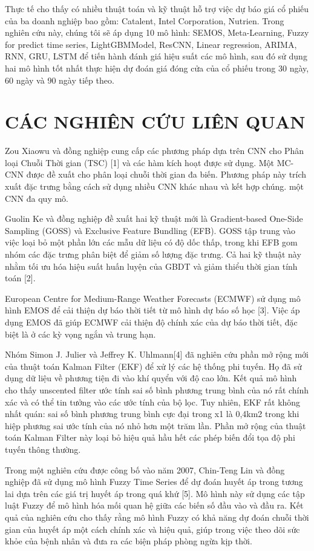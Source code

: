 \documentclass[conference]{IEEEtran}
\begin{document}
Thực tế cho thấy có nhiều thuật toán và kỹ thuật hỗ trợ việc dự báo giá cổ phiếu của ba doanh nghiệp bao gồm: Catalent, Intel Corporation, Nutrien. Trong nghiên cứu này, chúng tôi sẽ áp dụng 10 mô hình: SEMOS, Meta-Learning, Fuzzy for predict time series, LightGBMModel, ResCNN, Linear regression, ARIMA, RNN, GRU, LSTM để tiến hành đánh giá hiệu suất các mô hình, sau đó sử dụng hai mô hình tốt nhất thực hiện dự đoán giá đóng cửa của cổ phiếu trong 30 ngày, 60 ngày và 90 ngày tiếp theo. 

\section{CÁC NGHIÊN CỨU LIÊN QUAN}
Zou Xiaowu và đồng nghiệp cung cấp các phương pháp dựa trên CNN cho Phân loại Chuỗi Thời gian (TSC) [1] và các hàm kích hoạt được sử dụng. Một MC-CNN được đề xuất cho phân loại chuỗi thời gian đa biến. Phương pháp này trích xuất đặc trưng bằng cách sử dụng nhiều CNN khác nhau và kết hợp chúng. một CNN đa quy mô.

Guolin Ke và đồng nghiệp đề xuất hai kỹ thuật mới là Gradient-based One-Side Sampling (GOSS) và Exclusive Feature Bundling (EFB). GOSS tập trung vào việc loại bỏ một phần lớn các mẫu dữ liệu có độ dốc thấp, trong khi EFB gom nhóm các đặc trưng phân biệt để giảm số lượng đặc trưng. Cả hai kỹ thuật này nhằm tối ưu hóa hiệu suất huấn luyện của GBDT và giảm thiểu thời gian tính toán [2].

European Centre for Medium-Range Weather Forecasts (ECMWF) sử dụng mô hình EMOS để cải thiện dự báo thời tiết từ mô hình dự báo số học [3]. Việc áp dụng EMOS đã giúp ECMWF cải thiện độ chính xác của dự báo thời tiết, đặc biệt là ở các kỳ vọng ngắn và trung hạn.

Nhóm Simon J. Julier và Jeffrey K. Uhlmann[4] đã nghiên cứu phần mở rộng mới của thuật toán Kalman Filter (EKF) để xử lý các hệ thống phi tuyến. Họ đã sử dụng dữ liệu về phương tiện đi vào khí quyển với độ cao lớn. Kết quả mô hình cho thấy unscented filter ước tính sai số bình phương trung bình của nó rất chính xác và có thể tin tưởng vào các ước tính của bộ lọc. Tuy nhiên, EKF rất không nhất quán: sai số bình phương trung bình cực đại trong x1 là 0,4km2 trong khi hiệp phương sai ước tính của nó nhỏ hơn một trăm lần. Phần mở rộng của thuật toán Kalman Filter này loại bỏ hiệu quả hầu hết các phép biến đổi tọa độ phi tuyến thông thường.

Trong một nghiên cứu được công bố vào năm 2007, Chin-Teng Lin và đồng nghiệp đã sử dụng mô hình Fuzzy Time Series để dự đoán huyết áp trong tương lai dựa trên các giá trị huyết áp trong quá khứ [5]. Mô hình này sử dụng các tập luật Fuzzy để mô hình hóa mối quan hệ giữa các biến số đầu vào và đầu ra. Kết quả của nghiên cứu cho thấy rằng mô hình Fuzzy có khả năng dự đoán chuỗi thời gian của huyết áp một cách chính xác và hiệu quả, giúp trong việc theo dõi sức khỏe của bệnh nhân và đưa ra các biện pháp phòng ngừa kịp thời.
\end{document}
